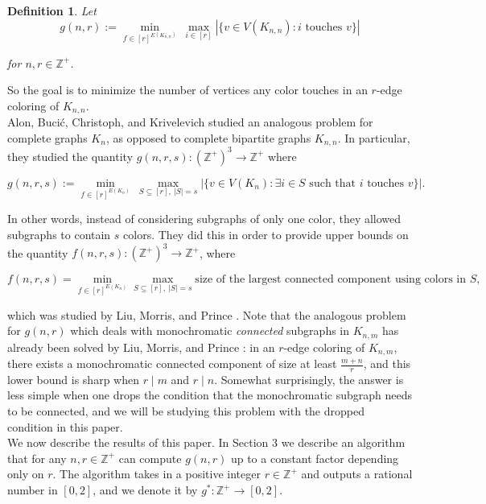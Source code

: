 \documentclass{article}
\newtheorem{definition}{Definition}
\begin{document}
\begin{definition}
Let
$$g(n,r) := \min_{f \in [r]^{E(K_{n,n})}} \ \max_{i \in [r]} |\{v \in V(K_{n,n}) : i \text{ touches } v \}|$$

\noindent
for $n,r \in \mathbb{Z}^{+}$.
\end{definition}

\noindent
So the goal is to minimize the number of vertices any color touches in an $r$-edge coloring of $K_{n,n}$. \\ 

Alon, Bucić, Christoph, and Krivelevich \cite{alon} studied an analogous problem for complete graphs $K_n$, as opposed to complete bipartite graphs $K_{n,n}$. In particular, they studied the quantity $g(n,r,s) : (\mathbb{Z}^{+})^3 \rightarrow \mathbb{Z}^{+}$ where

$$g(n,r,s) := \min_{f \in [r]^{E(K_{n})}} \ \max_{S \subseteq [r], \ |S| = s} |\{v \in V(K_{n}) : \exists i \in S \text{ such that $i$ touches $v$}\}|.$$

In other words, instead of considering subgraphs of only one color, they allowed subgraphs to contain $s$ colors. They did this in order to provide upper bounds on the quantity $f(n,r,s) : (\mathbb{Z}^{+})^3 \rightarrow \mathbb{Z}^{+}$, where

 $$ f(n,r,s) = \min_{f \in [r]^{E(K_n)}} \max_{S \subseteq [r], \ |S| = s} \text{size of the largest connected component using colors in $S$},$$ 

\noindent
 which was studied by Liu, Morris, and Prince \cite{liu}. Note that the analogous problem for $g(n,r)$ which deals with monochromatic \textit{connected} subgraphs in $K_{n,m}$ has already been solved by Liu, Morris, and Prince \cite{liu}: in an $r$-edge coloring of $K_{n,m}$, there exists a monochromatic connected component of size at least $\frac{m+n}{r}$, and this lower bound is sharp when $r \mid m$ and $r \mid n$. Somewhat surprisingly, the answer is less simple when one drops the condition that the monochromatic subgraph needs to be connected, and we will be studying this problem with the dropped condition in this paper.  \\

We now describe the results of this paper. In Section 3 we describe an algorithm that for any $n,r \in \mathbb{Z}^{+}$ can compute $g(n,r)$ up to a constant factor depending only on $r$. The algorithm takes in a positive integer $r \in \mathbb{Z}^{+}$ and outputs a rational number in $[0,2]$, and we denote it by $g^* : \mathbb{Z}^{+} \rightarrow [0,2]$. \\
\end{document}

